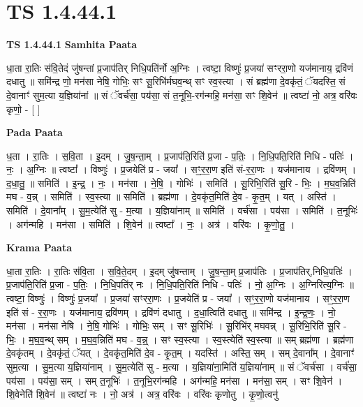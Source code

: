 \documentclass[17pt]{extarticle}
\begin{document}
\section*{ TS 1.4.44.1 }

\textbf{TS 1.4.44.1 } \newline
\textbf{Samhita Paata} \newline

धा॒ता रा॒तिः स॑वि॒तेदं जु॑षन्तां प्र॒जाप॑तिर् निधि॒पति॑र्नो अ॒ग्निः । त्वष्टा॒ विष्णुः॑ प्र॒जया॑ सꣳररा॒णो यज॑मानाय॒ द्रवि॑णं दधातु ॥ समि॑न्द्र णो॒ मन॑सा नेषि॒ गोभिः॒ सꣳ सू॒रिभि॑र्मघव॒न्थ् सꣳ स्व॒स्त्या । सं ब्रह्म॑णा दे॒वकृ॑तं॒ ॅयदस्ति॒ सं दे॒वानाꣳ॑ सुम॒त्या य॒ज्ञिया॑नां ॥ सं ॅवर्च॑सा॒ पय॑सा॒ सं त॒नूभि॒-रग॑न्महि॒ मन॑सा॒ सꣳ शि॒वेन॑ ॥ त्वष्टा॑ नो॒ अत्र॒ वरि॑वः कृणो॒ - [ ] \newline

\textbf{Pada Paata} \newline

ध॒ता । रा॒तिः । स॒वि॒ता । इ॒दम् । जु॒ष॒न्ता॒म् । प्र॒जाप॑ति॒रिति॑ प्र॒जा - प॒तिः॒ । नि॒धि॒पति॒रिति॑ निधि - पतिः॑ । नः॒ । अ॒ग्निः ॥ त्वष्टा᳚ । विष्णुः॑ । प्र॒जयेति॑ प्र - जया᳚ । सꣳ॒॒र॒रा॒ण इति॑ सं-र॒रा॒णः । यज॑मानाय । द्रवि॑णम् । द॒धा॒तु॒ ॥ समिति॑ । इ॒न्द्र॒ । नः॒ । मन॑सा । ने॒षि॒ । गोभिः॑ । समिति॑ । सू॒रिभि॒रिति॑ सू॒रि - भिः॒ । म॒घ॒व॒न्निति॑ मघ - व॒न्न् । समिति॑ । स्व॒स्त्या ॥ समिति॑ । ब्रह्म॑णा । दे॒वकृ॑त॒मिति॑ दे॒व - कृ॒त॒म् । यत् । अस्ति॑ । समिति॑ । दे॒वाना᳚म् । सु॒म॒त्येति॑ सु - म॒त्या । य॒ज्ञिया॑नाम् ॥ समिति॑ । वर्च॑सा । पय॑सा । समिति॑ । त॒नूभिः॑ । अग॑न्महि । मन॑सा । समिति॑ । शि॒वेन॑ ॥ त्वष्टा᳚ । नः॒ । अत्र॑ । वरि॑वः । कृ॒णो॒तु॒ ।  \newline


\textbf{Krama Paata} \newline

धा॒ता रा॒तिः । रा॒तिः स॑वि॒ता । स॒वि॒ते॒दम् । इ॒दम् जु॑षन्ताम् । जु॒ष॒न्ता॒म् प्र॒जाप॑तिः । प्र॒जाप॑तिर्,निधि॒पतिः॑ । प्र॒जाप॑ति॒रिति॑ प्र॒जा - प॒तिः॒ । नि॒धि॒पति॑र् नः । नि॒धि॒पति॒रिति॑ निधि - पतिः॑ । नो॒ अ॒ग्निः । अ॒ग्निरित्य॒ग्निः ॥ त्वष्टा॒ विष्णुः॑ । विष्णुः॑ प्र॒जया᳚ । प्र॒जया॑ सꣳररा॒णः । प्र॒जयेति॑ प्र - जया᳚ । सꣳ॒॒र॒रा॒णो यज॑मानाय । सꣳ॒॒र॒रा॒ण इति॑ सं - र॒रा॒णः । यज॑मानाय॒ द्रवि॑णम् । द्रवि॑णं दधातु । द॒धा॒त्विति॑ दधातु ॥ समि॑न्द्र । इ॒न्द्र॒णः॒ । नो॒ मन॑सा । मन॑सा नेषि । ने॒षि॒ गोभिः॑ । गोभिः॒ सम् । सꣳ सू॒रिभिः॑ । सू॒रिभि॑र् मघवन्न् । सू॒रिभि॒रिति॑ सू॒रि - भिः॒ । म॒घ॒व॒न्थ् सम् । म॒घ॒व॒न्निति॑ मघ - व॒न्न्॒ । सꣳ स्व॒स्त्या । स्व॒स्त्येति॑ स्व॒स्त्या ॥ सम् ब्रह्म॑णा । ब्रह्म॑णा दे॒वकृ॑तम् । दे॒वकृ॑तं॒ ॅयत् । दे॒वकृ॑त॒मिति॑ दे॒व - कृ॒त॒म् । यदस्ति॑ । अस्ति॒ सम् । सम् दे॒वाना᳚म् । दे॒वानाꣳ॑ सुम॒त्या । सु॒म॒त्या य॒ज्ञिया॑नाम् । सु॒म॒त्येति॑ सु - म॒त्या । य॒ज्ञिया॑ना॒मिति॑ य॒ज्ञिया॑नाम् ॥ सं ॅवर्च॑सा । वर्च॑सा॒ पय॑सा । पय॑सा॒ सम् । सम् त॒नूभिः॑ । त॒नूभि॒रग॑न्महि । अग॑न्महि॒ मन॑सा । मन॑सा॒ सम् । सꣳ शि॒वेन॑ । शि॒वेनेति॑ शि॒वेन॑ ॥ त्वष्टा॑ नः । नो॒ अत्र॑ । अत्र॒ वरि॑वः । वरि॑वः कृणोतु । कृ॒णो॒त्वनु॑ \newline
\end{document}
